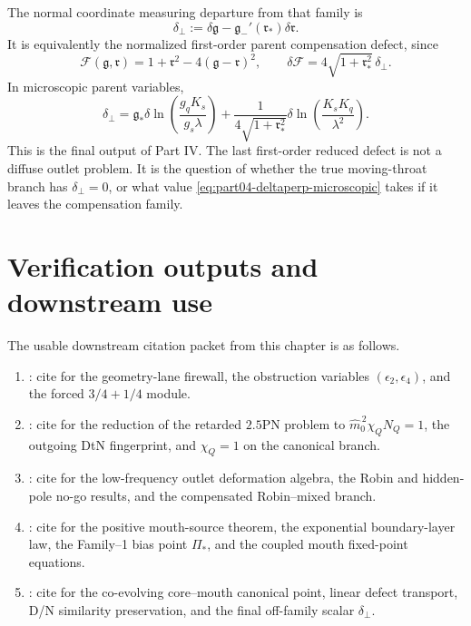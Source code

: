 The normal coordinate measuring departure from that family is
\begin{equation}
\label{eq:part04-deltaperp-def}
\delta_\perp
:=
\delta\mathfrak g
-
\mathfrak g_-'(\mathfrak r_*)\delta\mathfrak r.
\end{equation}
It is equivalently the normalized first-order parent compensation defect, since
\begin{equation}
\label{eq:part04-deltaF-deltaperp}
\mathcal F(\mathfrak g,\mathfrak r)=1+\mathfrak r^2-4(\mathfrak g-\mathfrak r)^2,
\qquad
\delta\mathcal F=4\sqrt{1+\mathfrak r_*^2}\,\delta_\perp.
\end{equation}
In microscopic parent variables,
\begin{equation}
\label{eq:part04-deltaperp-microscopic}
\boxed{
\delta_\perp
=
\mathfrak g_*
\delta\ln\left(\frac{g_qK_s}{g_s\lambda}\right)
+
\frac{1}{4\sqrt{1+\mathfrak r_*^2}}
\delta\ln\left(\frac{K_sK_q}{\lambda^2}\right)}.
\end{equation}
This is the final output of Part IV.  The last first-order reduced defect is not a diffuse outlet problem.  It is the question of whether the true moving-throat branch has \(\delta_\perp=0\), or what value \eqref{eq:part04-deltaperp-microscopic} takes if it leaves the compensation family.

\section{Verification outputs and downstream use}
\label{sec:part04-verification-outputs}

The usable downstream citation packet from this chapter is as follows.
\begin{enumerate}[leftmargin=2.2em]
\item {}: cite for the geometry-lane firewall, the obstruction variables \((\epsilon_2,\epsilon_4)\), and the forced \(3/4+1/4\) module.
\item {}: cite for the reduction of the retarded \(2.5\)PN problem to \(\widehat m_0^{\,2}\chi_QN_Q=1\), the outgoing DtN fingerprint, and \(\chi_Q=1\) on the canonical branch.
\item {}: cite for the low-frequency outlet deformation algebra, the Robin and hidden-pole no-go results, and the compensated Robin--mixed branch.
\item {}: cite for the positive mouth-source theorem, the exponential boundary-layer law, the Family--1 bias point \(\Pi_*\), and the coupled mouth fixed-point equations.
\item {}: cite for the co-evolving core--mouth canonical point, linear defect transport, D/N similarity preservation, and the final off-family scalar \(\delta_\perp\).
\end{enumerate}


